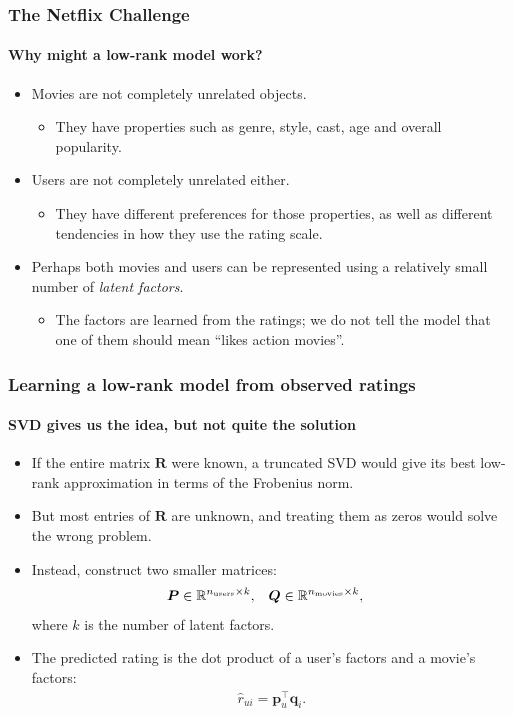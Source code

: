 \documentclass[]{article}
\begin{document}
\begin{frame}
\frametitle{The Netflix Challenge}
\framesubtitle{Why might a low-rank model work?}
\begin{itemize}
	\item<+-> Movies are not completely unrelated objects.
	\begin{itemize}
		\item<+-> They have properties such as genre, style, cast, age and overall popularity.
	\end{itemize}
	\item<+-> Users are not completely unrelated either.
	\begin{itemize}
		\item<+-> They have different preferences for those properties, as well as different tendencies in how they use the rating scale.
	\end{itemize}
	\item<+-> Perhaps both movies and users can be represented using a relatively small number of \emph{latent factors}.
	\begin{itemize}
		\item<+-> The factors are learned from the ratings; we do not tell the model that one of them should mean ``likes action movies''.
	\end{itemize}
\end{itemize}
\end{frame}

\begin{frame}
\frametitle{Learning a low-rank model from observed ratings}
\framesubtitle{SVD gives us the idea, but not quite the solution}
\begin{itemize}
	\item<+-> If the entire matrix $\bm R$ were known, a truncated SVD would give its best low-rank approximation in terms of the Frobenius norm.
	\item<+-> But most entries of $\bm R$ are unknown, and treating them as zeros would solve the wrong problem.
	\item<+-> Instead, construct two smaller matrices:
	\begin{align*}
		\bm P&\in\mathbb{R}^{n_{\rm users}\times k}, &
		\bm Q&\in\mathbb{R}^{n_{\rm movies}\times k},
	\end{align*}
	where $k$ is the number of latent factors.
	\item<+-> The predicted rating is the dot product of a user's factors and a movie's factors:
	\begin{align*}
		\hat r_{ui}=\bm p_u^\top\bm q_i.
	\end{align*}
\end{itemize}
\end{frame}
\end{document}
